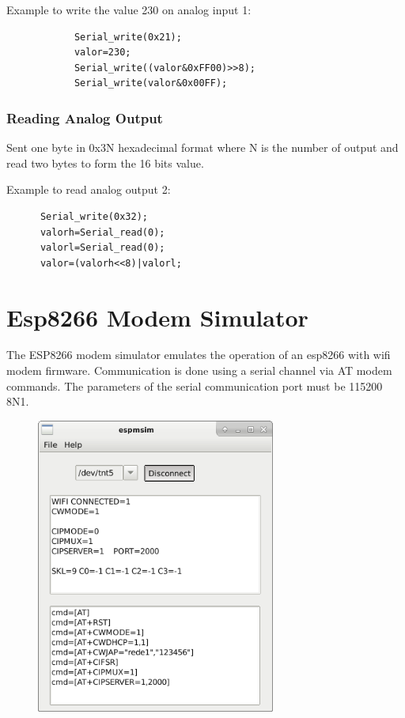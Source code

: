 Example to write the value 230 on analog input 1:
\begin{verbatim}
            Serial_write(0x21);
            valor=230;
            Serial_write((valor&0xFF00)>>8);
            Serial_write(valor&0x00FF);
\end{verbatim}

\subsubsection{Reading Analog Output}
Sent one byte in 0x3N hexadecimal format where N  is the number of output and read two bytes to form the 16 bits value.

Example to read analog output 2:
\begin{verbatim}
      Serial_write(0x32);
      valorh=Serial_read(0);
      valorl=Serial_read(0);
      valor=(valorh<<8)|valorl;
\end{verbatim}



\section{Esp8266 Modem Simulator} \hypertarget{def:espmsim}{}


The ESP8266 modem simulator emulates the operation of an esp8266
with wifi modem firmware. Communication is done using a serial channel via 
AT modem commands. 
The parameters of the serial communication port must be  115200 8N1. 

\begin{figure}[H]
\center
\includegraphics[width=0.7\textwidth]{img/espmsim.png} 
\end{figure} 

